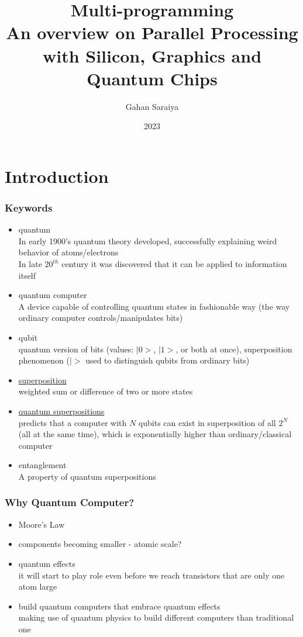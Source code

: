 \documentclass[xcolor=x11names,table]{beamer}
\title{Multi-programming
\\ An overview on Parallel Processing with Silicon, Graphics and Quantum Chips}
\author{Gahan Saraiya}
\institute{Firmware Development Engineer 
	\\ Intel Technology India Pvt Ltd}
\date{{\scriptsize 2023}}
\begin{document}
\begin{frame}
\titlepage
\end{frame}


\section{Introduction}


	\begin{frame}[allowframebreaks]
	\frametitle{Keywords}
		\begin{itemize}
			\item quantum
				{\scriptsize \\ In early 1900's quantum theory developed, successfully explaining weird behavior of atoms/electrons
				\\ In late $20^{th}$ century it was discovered that it can be applied to information itself}
			\item quantum computer
				{\scriptsize \\ A device capable of controlling quantum states in fashionable way (the way ordinary computer controls/manipulates bits)}
			\item qubit
				{\scriptsize \\ quantum version of bits (values: $|0>$, $|1>$, or both at once), superposition phenomenon
				($|>$ used to distinguish qubits from ordinary bits)}
			\item \href{https://en.wikipedia.org/wiki/Superposition_principle}{superposition}
				{\scriptsize \\ weighted sum or difference of two or more states}
			\item \href{https://en.wikipedia.org/wiki/Quantum_superposition}{quantum superpositions}
				{\scriptsize \\ predicts that a computer with $N$ qubits can exist in superposition of all $2^N$ (all at the same time), which is exponentially higher than ordinary/classical computer}
			\item {entanglement}
				{\scriptsize \\ A property of quantum superpositions}
		\end{itemize}
	\end{frame}
	
	
	\begin{frame}
	\frametitle{Why Quantum Computer?}
	
	\begin{itemize}
		\item Moore's Law
		\item components becoming smaller - atomic scale?
		\item quantum effects
			\\ {\scriptsize 
				it will start to play role even before we reach transistors that are only one atom large
			}
		\item build quantum computers that embrace quantum effects
			\\ {\scriptsize 
				making use of quantum physics to build different computers than traditional one
			}
	\end{itemize}
	\end{frame}
\end{document}
